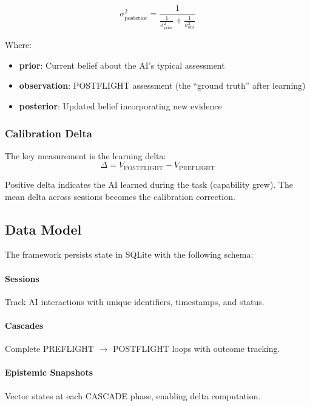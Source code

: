 \begin{equation}
\sigma^2_{\text{posterior}} = \frac{1}{\frac{1}{\sigma^2_{\text{prior}}} + \frac{1}{\sigma^2_{\text{obs}}}}
\end{equation}

Where:
\begin{itemize}
    \item \textbf{prior}: Current belief about the AI's typical assessment
    \item \textbf{observation}: POSTFLIGHT assessment (the ``ground truth'' after learning)
    \item \textbf{posterior}: Updated belief incorporating new evidence
\end{itemize}

\subsubsection{Calibration Delta}

The key measurement is the learning delta:
\begin{equation}
\Delta = V_{\text{POSTFLIGHT}} - V_{\text{PREFLIGHT}}
\end{equation}

Positive delta indicates the AI learned during the task (capability grew). The mean delta across sessions becomes the calibration correction.

\subsection{Data Model}

The framework persists state in SQLite with the following schema:

\paragraph{Sessions} Track AI interactions with unique identifiers, timestamps, and status.

\paragraph{Cascades} Complete PREFLIGHT $\rightarrow$ POSTFLIGHT loops with outcome tracking.

\paragraph{Epistemic Snapshots} Vector states at each CASCADE phase, enabling delta computation.

